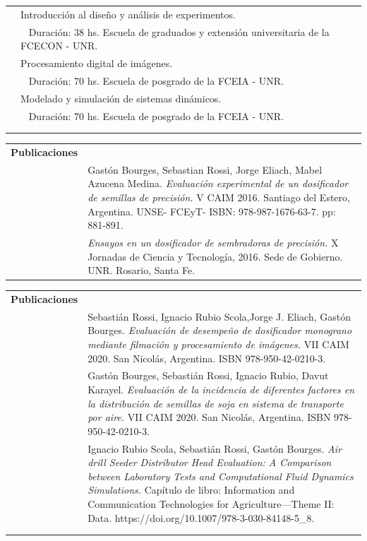 \documentclass[a4paper,10pt, sans]{article}
\begin{document}
\begin{table}[H]
\begin{tabularx}{\textwidth}{r X}
      {} & Introducción al diseño y análisis de experimentos. \\
      {} & ~ Duración: 38 hs. Escuela de graduados y extensión universitaria de la FCECON - UNR. \\
      {} & Procesamiento digital de imágenes. \\
      {} & ~ Duración: 70 hs. Escuela de posgrado de la FCEIA - UNR. \\
      {} & Modelado y simulación de sistemas dinámicos. \\
      {} & ~ Duración: 70 hs. Escuela de posgrado de la FCEIA - UNR. \\ \\ \hline \\
\end{tabularx}
\end{table}

\begin{table}[H]
\begin{tabularx}{\textwidth}{r X}  
    \textbf{Publicaciones} & {} \\ [1ex]
      {} & Gastón Bourges, Sebastian Rossi, Jorge Eliach, Mabel Azucena Medina. \textit{Evaluación experimental de un dosificador de semillas de precisión.} V CAIM 2016. Santiago del Estero, Argentina. UNSE- FCEyT- ISBN: 978-987-1676-63-7. pp: 881-891. \\  [1ex]
      {} & \textit{Ensayos en un dosificador de sembradoras de precisión.} X Jornadas de Ciencia y Tecnología, 2016. Sede de Gobierno. UNR. Rosario, Santa Fe. \\  [1ex] 
\end{tabularx}
\end{table}

\begin{table}[H]
\begin{tabularx}{\textwidth}{r X}  
    \textbf{Publicaciones} & {} \\ [1ex]
      {} & Sebastián Rossi, Ignacio Rubio Scola,Jorge J. Eliach, Gastón Bourges. \textit{Evaluación de desempeño de dosificador monograno mediante filmación y procesamiento de imágenes.} VII CAIM 2020. San Nicolás, Argentina. ISBN 978-950-42-0210-3. \\  [1ex]
      {} & Gastón Bourges, Sebastián Rossi, Ignacio Rubio, Davut Karayel. \textit{Evaluación de la incidencia de diferentes factores en la distribución de semillas de soja en sistema de transporte por aire.} VII CAIM 2020. San Nicolás, Argentina. ISBN 978-950-42-0210-3. \\ [1ex]
      {} & Ignacio Rubio Scola, Sebastián Rossi, Gastón Bourges. \textit{Air drill Seeder Distributor Head Evaluation: A Comparison between Laboratory Tests and Computational Fluid Dynamics Simulations.} Capítulo de libro: Information and Communication Technologies for Agriculture—Theme II: Data. https://doi.org/10.1007/978-3-030-84148-5\_8. \\ \\ \hline \\
\end{tabularx}
\end{table}
\end{document}
